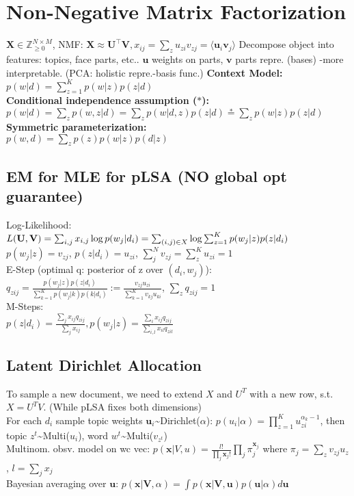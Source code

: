 \section{Non-Negative Matrix Factorization}
$\mathbf{X} \in \mathbb{Z}^{N \times M}_{\geq 0}$, NMF: $\mathbf{X} \approx \mathbf{U^\top V}, x_{ij}=\sum_z{u_{zi}v_{zj}}=\langle\mathbf{u}_i \mathbf{v}_j\rangle$
Decompose object into features: topics, face parts, etc.. $\mathbf{u}$ weights on parts, $\mathbf{v}$ parts repre. (bases) -more interpretable. (PCA: holistic repre.-basis func.)
\textbf{Context Model:} $p(w | d) = \sum_{z=1}^K p(w | z) p(z | d)$\\
\textbf{Conditional independence assumption ($*$):}\\
$p(w|d) = \sum_z p(w,z|d) = \sum_z p(w|d,z)p(z|d) \stackrel{*}{=} \sum_z p(w|z)p(z|d)$\\
\textbf{Symmetric parameterization:}\\
$p(w, d) = \sum_z p(z)p(w | z) p(d | z)$ \\
\subsection*{EM for MLE for pLSA (NO global opt guarantee)}
Log-Likelihood: $L(\mathbf{U}, \mathbf{V}) = \sum_{i,j} x_{i,j}\log p(w_j|d_i) \\
= \sum_{(i,j) \in X} \log \sum_{z=1}^K p(w_j|z)p(z|d_i)$ \\ 
$ p(w_j|z) = v_{zj}$, $p(z|d_i) = u_{zi}$, $\sum_j^N v_{zj} = \sum_z^K u_{zi} = 1$\\
E-Step (optimal q: posterior of z over $(d_i, w_j)$):\\
$q_{zij} = \frac{p(w_j|z)p(z|d_i)}{\sum_{k=1}^K p(w_j|k)p(k|d_i)} := \frac{v_{zj}u_{zi}}{\sum_{k=1}^K v_{kj}u_{ki}}$, $\sum_z q_{zij}=1$\\
M-Steps:\\
$p(z|d_i) = \frac{\sum_j x_{ij}q_{zij}}{\sum_j x_{ij}}, p(w_j|z) = \frac{\sum_i x_{ij}q_{zij}}{\sum_{i,l}x_{il}q_{zil}}$\\

\subsection*{Latent Dirichlet Allocation}
To sample a new document, we need to extend $X$ and $U^T$ with a new row, s.t. $X=U^T V$. (While pLSA fixes both dimensions)\\
For each $d_i$ sample topic weights $\mathbf{u}_i$\textasciitilde Dirichlet($\alpha$): $p(u_i|\alpha) = \prod_{z=1}^K u_{zi}^{\alpha_k-1}$, then topic $z^t$\textasciitilde Multi($u_i$), word $w^t$\textasciitilde Multi($v_{z^t}$)\\
Multinom. obsv. model on wc vec: $p(\mathbf{x}|V,u) = \frac{l!}{\prod_j \mathbf{x}_j!}\prod_j \pi_j^{\mathbf{x}_j}$ 
where $\pi_j=\sum_z v_{zj} u_z$, $l=\sum_j x_j$ \\
Bayesian averaging over $\mathbf{u}$: $p(\mathbf{x}|\mathbf{V},\alpha)=\int p(\mathbf{x}|\mathbf{V},\mathbf{u})p(\mathbf{u}|\alpha)d\mathbf{u}$

